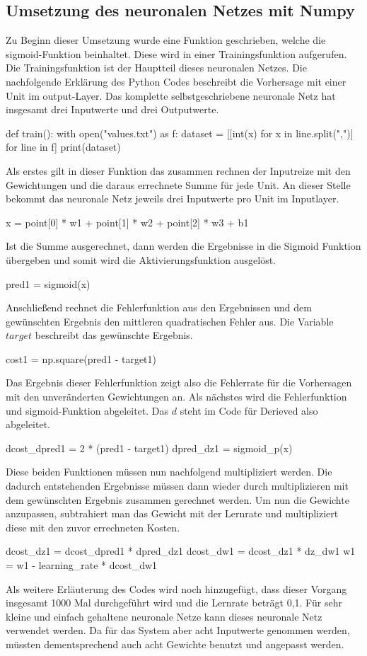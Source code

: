 \subsection{Umsetzung des neuronalen Netzes mit Numpy}
Zu Beginn dieser Umsetzung wurde eine Funktion geschrieben, welche die sigmoid-Funktion beinhaltet. Diese wird in einer Trainingsfunktion aufgerufen. Die Trainingsfunktion ist der Hauptteil dieses neuronalen Netzes. 
\newline
Die nachfolgende Erklärung des Python Codes beschreibt die Vorhersage mit einer Unit im output-Layer. Das komplette selbstgeschriebene neuronale Netz hat insgesamt drei Inputwerte und drei Outputwerte.
\begin{python}
def train():
    with open("values.txt") as f:
        dataset = [[int(x) for x in line.split(",")] 
                    for line in f]
        print(dataset)
\end{python}
Als erstes gilt in dieser Funktion das zusammen rechnen der Inputreize mit den Gewichtungen und die daraus errechnete Summe für jede Unit. An dieser Stelle bekommt das neuronale Netz jeweils drei Inputwerte pro Unit im Inputlayer.
\begin{python}
x = point[0] * w1 + point[1] * w2 + point[2] * w3 + b1
\end{python}
Ist die Summe ausgerechnet, dann werden die Ergebnisse in die Sigmoid Funktion übergeben und somit wird die Aktivierungsfunktion ausgelöst.
\begin{python}
pred1 = sigmoid(x)
\end{python}
Anschließend rechnet die Fehlerfunktion aus den Ergebnissen und dem gewünschten Ergebnis den mittleren quadratischen Fehler aus. Die Variable \(target\) beschreibt das gewünschte Ergebnis.
\begin{python}
cost1 = np.square(pred1 - target1)
\end{python}
Das Ergebnis dieser Fehlerfunktion zeigt also die Fehlerrate für die Vorhersagen mit den unveränderten Gewichtungen an. Als nächstes wird die Fehlerfunktion und sigmoid-Funktion abgeleitet.
Das \(d\) steht im Code für Derieved also abgeleitet. 
\begin{python}
dcost_dpred1 = 2 * (pred1 - target1)
dpred_dz1 = sigmoid_p(x)
\end{python}
Diese beiden Funktionen müssen nun nachfolgend multipliziert werden. Die dadurch entstehenden Ergebnisse müssen dann wieder durch multiplizieren mit dem gewünschten Ergebnis zusammen gerechnet werden. 
Um nun die Gewichte anzupassen, subtrahiert man das Gewicht mit der Lernrate und multipliziert diese mit den zuvor errechneten Kosten.
\begin{python}
dcost_dz1 = dcost_dpred1 * dpred_dz1
dcost_dw1 = dcost_dz1 * dz_dw1
w1 = w1 - learning_rate * dcost_dw1
\end{python}
Als weitere Erläuterung des Codes wird noch hinzugefügt, dass dieser Vorgang insgesamt 1000 Mal durchgeführt wird und die Lernrate beträgt 0,1.
\newline
Für sehr kleine und einfach gehaltene neuronale Netze kann dieses neuronale Netz verwendet werden. Da für das System aber acht Inputwerte genommen werden, müssten dementsprechend auch acht Gewichte benutzt und angepasst werden.

